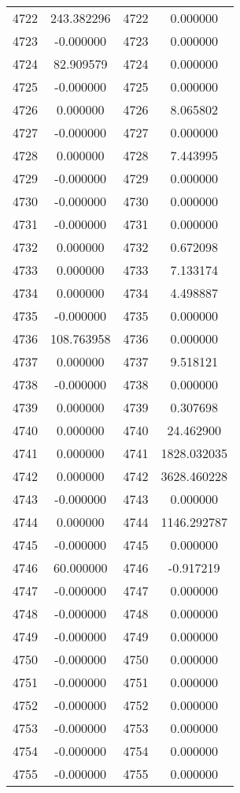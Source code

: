 \documentclass[12pt]{article}
\begin{document}
\begin{longtable}{@{}cccc@{}}
4722 & 243.382296 & 4722 & 0.000000 \\
4723 & -0.000000 & 4723 & 0.000000 \\
4724 & 82.909579 & 4724 & 0.000000 \\
4725 & -0.000000 & 4725 & 0.000000 \\
4726 & 0.000000 & 4726 & 8.065802 \\
4727 & -0.000000 & 4727 & 0.000000 \\
4728 & 0.000000 & 4728 & 7.443995 \\
4729 & -0.000000 & 4729 & 0.000000 \\
4730 & -0.000000 & 4730 & 0.000000 \\
4731 & -0.000000 & 4731 & 0.000000 \\
4732 & 0.000000 & 4732 & 0.672098 \\
4733 & 0.000000 & 4733 & 7.133174 \\
4734 & 0.000000 & 4734 & 4.498887 \\
4735 & -0.000000 & 4735 & 0.000000 \\
4736 & 108.763958 & 4736 & 0.000000 \\
4737 & 0.000000 & 4737 & 9.518121 \\
4738 & -0.000000 & 4738 & 0.000000 \\
4739 & 0.000000 & 4739 & 0.307698 \\
4740 & 0.000000 & 4740 & 24.462900 \\
4741 & 0.000000 & 4741 & 1828.032035 \\
4742 & 0.000000 & 4742 & 3628.460228 \\
4743 & -0.000000 & 4743 & 0.000000 \\
4744 & 0.000000 & 4744 & 1146.292787 \\
4745 & -0.000000 & 4745 & 0.000000 \\
4746 & 60.000000 & 4746 & -0.917219 \\
4747 & -0.000000 & 4747 & 0.000000 \\
4748 & -0.000000 & 4748 & 0.000000 \\
4749 & -0.000000 & 4749 & 0.000000 \\
4750 & -0.000000 & 4750 & 0.000000 \\
4751 & -0.000000 & 4751 & 0.000000 \\
4752 & -0.000000 & 4752 & 0.000000 \\
4753 & -0.000000 & 4753 & 0.000000 \\
4754 & -0.000000 & 4754 & 0.000000 \\
4755 & -0.000000 & 4755 & 0.000000 \\

\end{longtable}
\end{document}
